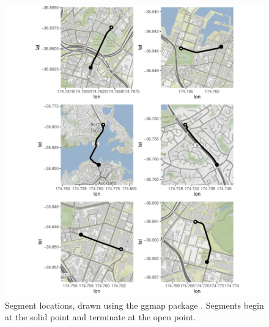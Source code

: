 \begin{knitrout}\small
{}\color{fgcolor}\begin{figure}

{\centering \includegraphics[width=\textwidth]{figure/nw_seg_maps-1} 

}

\caption[Segment locations, drawn using the ggmap package \citep{ggmap}]{Segment locations, drawn using the ggmap package \citep{ggmap}. Segments begin at the solid point and terminate at the open point.}\label{fig:nw_seg_maps}
\end{figure}


\end{knitrout}




